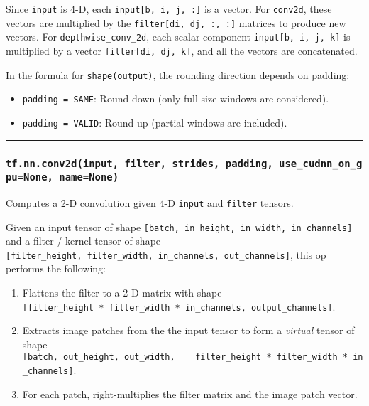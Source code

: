 Since \texttt{input} is 4-D, each \texttt{input{[}b,\ i,\ j,\ :{]}} is a
vector. For \texttt{conv2d}, these vectors are multiplied by the
\texttt{filter{[}di,\ dj,\ :,\ :{]}} matrices to produce new vectors.
For \texttt{depthwise\_conv\_2d}, each scalar component
\texttt{input{[}b,\ i,\ j,\ k{]}} is multiplied by a vector
\texttt{filter{[}di,\ dj,\ k{]}}, and all the vectors are concatenated.

In the formula for \texttt{shape(output)}, the rounding direction
depends on padding:

\begin{itemize}
\tightlist
\item
  \texttt{padding\ =\ \textquotesingle{}SAME\textquotesingle{}}: Round
  down (only full size windows are considered).
\item
  \texttt{padding\ =\ \textquotesingle{}VALID\textquotesingle{}}: Round
  up (partial windows are included).
\end{itemize}

\begin{center}\rule{0.5\linewidth}{\linethickness}\end{center}

\subsubsection{\texorpdfstring{\texttt{tf.nn.conv2d(input,\ filter,\ strides,\ padding,\ use\_cudnn\_on\_gpu=None,\ name=None)}
}{tf.nn.conv2d(input, filter, strides, padding, use\_cudnn\_on\_gpu=None, name=None) }}\label{tf.nn.conv2dinput-filter-strides-padding-useux5fcudnnux5fonux5fgpunone-namenone}

Computes a 2-D convolution given 4-D \texttt{input} and \texttt{filter}
tensors.

Given an input tensor of shape
\texttt{{[}batch,\ in\_height,\ in\_width,\ in\_channels{]}} and a
filter / kernel tensor of shape
\texttt{{[}filter\_height,\ filter\_width,\ in\_channels,\ out\_channels{]}},
this op performs the following:

\begin{enumerate}
\def\labelenumi{\arabic{enumi}.}
\tightlist
\item
  Flattens the filter to a 2-D matrix with shape
  \texttt{{[}filter\_height\ *\ filter\_width\ *\ in\_channels,\ output\_channels{]}}.
\item
  Extracts image patches from the the input tensor to form a
  \emph{virtual} tensor of shape
  \texttt{{[}batch,\ out\_height,\ out\_width,\ \ \ \ filter\_height\ *\ filter\_width\ *\ in\_channels{]}}.
\item
  For each patch, right-multiplies the filter matrix and the image patch
  vector.
\end{enumerate}

